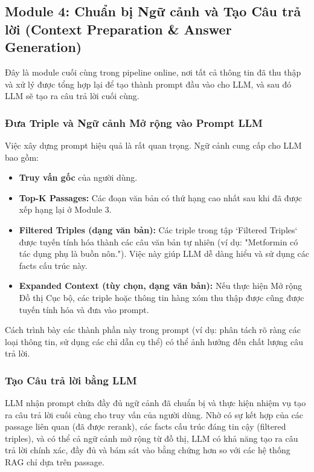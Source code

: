 \documentclass[../main.tex]{subfiles}
\begin{document}
\subsection{Module 4: Chuẩn bị Ngữ cảnh và Tạo Câu trả lời (Context Preparation \& Answer Generation)}

Đây là module cuối cùng trong pipeline online, nơi tất cả thông tin đã thu thập và xử lý được tổng hợp lại để tạo thành prompt đầu vào cho LLM, và sau đó LLM sẽ tạo ra câu trả lời cuối cùng.

\subsubsection{Đưa Triple và Ngữ cảnh Mở rộng vào Prompt LLM}

Việc xây dựng prompt hiệu quả là rất quan trọng. Ngữ cảnh cung cấp cho LLM bao gồm:
\begin{itemize}
    \item \textbf{Truy vấn gốc} của người dùng.
    \item \textbf{Top-K Passages:} Các đoạn văn bản có thứ hạng cao nhất sau khi đã được xếp hạng lại ở Module 3.
    \item \textbf{Filtered Triples (dạng văn bản):} Các triple trong tập `Filtered Triples` được tuyến tính hóa thành các câu văn bản tự nhiên (ví dụ: "Metformin có tác dụng phụ là buồn nôn."). Việc này giúp LLM dễ dàng hiểu và sử dụng các facts cấu trúc này.
    \item \textbf{Expanded Context (tùy chọn, dạng văn bản):} Nếu thực hiện Mở rộng Đồ thị Cục bộ, các triple hoặc thông tin hàng xóm thu thập được cũng được tuyến tính hóa và đưa vào prompt.
\end{itemize}
Cách trình bày các thành phần này trong prompt (ví dụ: phân tách rõ ràng các loại thông tin, sử dụng các chỉ dẫn cụ thể) có thể ảnh hưởng đến chất lượng câu trả lời.

\subsubsection{Tạo Câu trả lời bằng LLM}

LLM nhận prompt chứa đầy đủ ngữ cảnh đã chuẩn bị và thực hiện nhiệm vụ tạo ra câu trả lời cuối cùng cho truy vấn của người dùng. Nhờ có sự kết hợp của các passage liên quan (đã được rerank), các facts cấu trúc đáng tin cậy (filtered triples), và có thể cả ngữ cảnh mở rộng từ đồ thị, LLM có khả năng tạo ra câu trả lời chính xác, đầy đủ và bám sát vào bằng chứng hơn so với các hệ thống RAG chỉ dựa trên passage.
\end{document}
